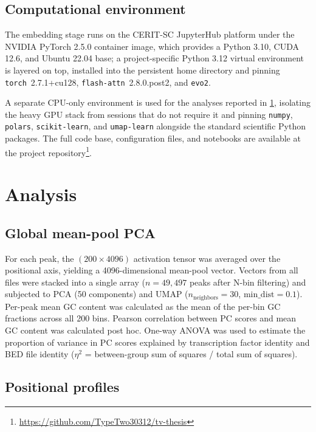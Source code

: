 \subsection{Computational environment}
\label{sec:env}

The embedding stage runs on the CERIT-SC JupyterHub platform under the NVIDIA PyTorch 2.5.0 container image, which provides a Python 3.10, CUDA 12.6, and Ubuntu 22.04 base; a project-specific Python 3.12 virtual environment is layered on top, installed into the persistent home directory and pinning \texttt{torch}~2.7.1+cu128, \texttt{flash-attn}~2.8.0.post2, and \texttt{evo2}.

A separate CPU-only environment is used for the analyses reported in \ref{sec:methods-analyses}, isolating the heavy GPU stack from sessions that do not require it and pinning \texttt{numpy}, \texttt{polars}, \texttt{scikit-learn}, and \texttt{umap-learn} alongside the standard scientific Python packages.
The full code base, configuration files, and notebooks are available at the project repository\footnote{\url{https://github.com/TypeTwo30312/tv-thesis}}.

\section{Analysis}
\label{sec:methods-analyses}

\subsection{Global mean-pool PCA}

For each peak, the $(200 \times 4096)$ activation tensor was averaged over the positional axis, yielding a 4096-dimensional mean-pool vector.
Vectors from all files were stacked into a single array ($n = 49{,}497$ peaks after N-bin filtering) and subjected to PCA (50 components) and UMAP ($n_\text{neighbors} = 30$, $\text{min\_dist} = 0.1$).
Per-peak mean GC content was calculated as the mean of the per-bin GC fractions across all 200 bins.
Pearson correlation between PC scores and mean GC content was calculated post hoc.
One-way ANOVA was used to estimate the proportion of variance in PC scores explained by transcription factor identity and BED file identity ($\eta^2$ = between-group sum of squares / total sum of squares).

\subsection{Positional profiles}
\label{sec:positional}

